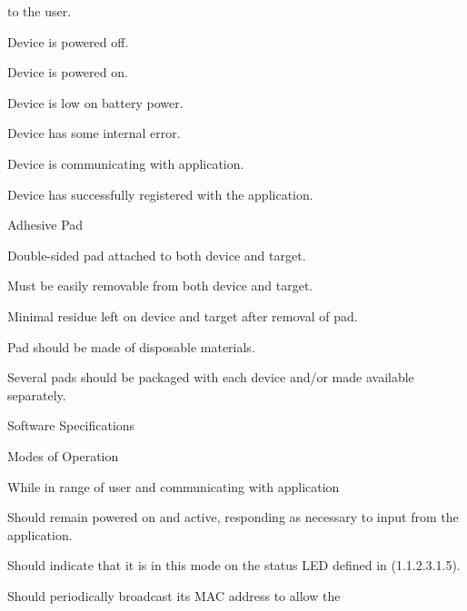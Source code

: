 \documentclass[12pt]{article}
\begin{document}
\begin{packed_enum}
\begin{packed_enum}
\begin{packed_enum}
\begin{packed_enum}
\begin{packed_enum}
                  to the user.
            \begin{packed_enum}
              \item Device is powered off.
              \item Device is powered on.
              \item Device is low on battery power.
              \item Device has some internal error.
              \item Device is communicating with application.
              \item Device has successfully registered with the application.
            \end{packed_enum}
          \end{packed_enum}
        \end{packed_enum}
        \item Adhesive Pad
        \begin{packed_enum}
          \item Double-sided pad attached to both device and target.
          \item Must be easily removable from both device and target.
          \item Minimal residue left on device and target after removal of pad.
          \item Pad should be made of disposable materials.
          \item Several pads should be packaged with each device and/or made
                available separately.
        \end{packed_enum}
      \end{packed_enum}
      \item Software Specifications
      \begin{packed_enum}
        \item Modes of Operation
        \begin{packed_enum}
          \item While in range of user and communicating with application
          \begin{packed_enum}
            \item Should remain powered on and active, responding as necessary
                  to input from the application.
            \item Should indicate that it is in this mode on the status LED
                  defined in (1.1.2.3.1.5).
            \item Should periodically broadcast its MAC address to allow the

\end{packed_enum}
\end{packed_enum}
\end{packed_enum}
\end{packed_enum}
\end{packed_enum}
\end{document}
